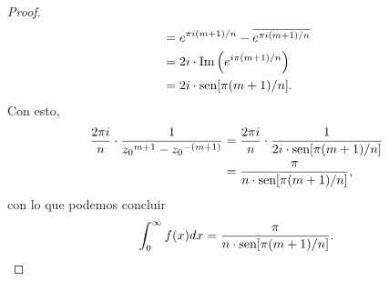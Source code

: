 \begin{proof}
$$\begin{aligned}
                                &=e^{\pi i(m+1)/n}-\overline{e^{\pi i(m+1)/n}}\\
                                &=2i\cdot\text{Im}\left( e^{i\pi (m+1)/n}\right)\\
                                &=2i\cdot\normalfont{\text{sen}}[\pi(m+1)/n].
   \end{aligned}
   $$
   Con esto,
   $$
   \begin{aligned}
      \frac{2\pi i}{n}\cdot\frac{1}{{z_0}^{m+1}-{z_0}^{-(m+1)}}&=\frac{2\pi i}{n}\cdot\frac{1}{2i\cdot\normalfont{\text{sen}}[\pi(m+1)/n]}\\
                                                               &=\frac{\pi}{n\cdot\normalfont{\text{sen}}[\pi(m+1)/n]},
   \end{aligned}
   $$
   con lo que podemos concluir
   $$
   \int_{0}^{\infty}f(x)dx=\frac{\pi}{n\cdot\normalfont{\text{sen}}[\pi(m+1)/n]}.
   $$
\end{proof}
